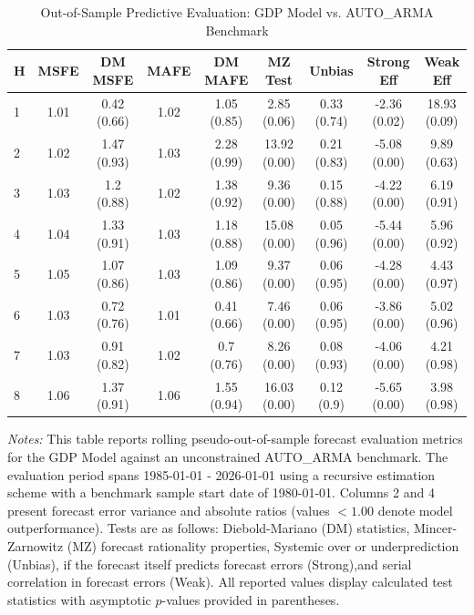 \begin{table}[htbp]
\centering
\caption{Out-of-Sample Predictive Evaluation: GDP Model vs. AUTO_ARMA Benchmark}
\label{tab:gdp_model_evaluation}
\footnotesize
\begin{tabular}{l cccccccc}
\hline\hline
\rule{0pt}{3ex}
\textbf{H} & \textbf{MSFE} & \textbf{DM MSFE} & \textbf{MAFE} & \textbf{DM MAFE} & \textbf{MZ Test} & \textbf{Unbias} & \textbf{Strong Eff} & \textbf{Weak Eff} \\[0.5ex]
\hline
\rule{0pt}{2.5ex}
1 & 1.01 & 0.42 (0.66) & 1.02 & 1.05 (0.85) & 2.85 (0.06) & 0.33 (0.74) & -2.36 (0.02) & 18.93 (0.09) \\
2 & 1.02 & 1.47 (0.93) & 1.03 & 2.28 (0.99) & 13.92 (0.00) & 0.21 (0.83) & -5.08 (0.00) & 9.89 (0.63) \\
3 & 1.03 & 1.2 (0.88) & 1.02 & 1.38 (0.92) & 9.36 (0.00) & 0.15 (0.88) & -4.22 (0.00) & 6.19 (0.91) \\
4 & 1.04 & 1.33 (0.91) & 1.03 & 1.18 (0.88) & 15.08 (0.00) & 0.05 (0.96) & -5.44 (0.00) & 5.96 (0.92) \\
5 & 1.05 & 1.07 (0.86) & 1.03 & 1.09 (0.86) & 9.37 (0.00) & 0.06 (0.95) & -4.28 (0.00) & 4.43 (0.97) \\
6 & 1.03 & 0.72 (0.76) & 1.01 & 0.41 (0.66) & 7.46 (0.00) & 0.06 (0.95) & -3.86 (0.00) & 5.02 (0.96) \\
7 & 1.03 & 0.91 (0.82) & 1.02 & 0.7 (0.76) & 8.26 (0.00) & 0.08 (0.93) & -4.06 (0.00) & 4.21 (0.98) \\
8 & 1.06 & 1.37 (0.91) & 1.06 & 1.55 (0.94) & 16.03 (0.00) & 0.12 (0.9) & -5.65 (0.00) & 3.98 (0.98) \\
\hline\hline
\end{tabular}%
\par\smallskip
\parbox{\textwidth}{\scriptsize \textit{Notes:} This table reports rolling pseudo-out-of-sample forecast evaluation metrics for the GDP Model against an unconstrained AUTO_ARMA benchmark. The evaluation period spans 1985-01-01 - 2026-01-01 using a recursive estimation scheme with a benchmark sample start date of 1980-01-01. Columns 2 and 4 present forecast error variance and absolute ratios (values $< 1.00$ denote model outperformance). Tests are as follows: Diebold-Mariano (DM) statistics, Mincer-Zarnowitz (MZ) forecast rationality properties, Systemic over or underprediction (Unbias), if the forecast itself predicts forecast errors (Strong),and serial correlation in forecast errors (Weak). All reported values display calculated test statistics with asymptotic $p$-values provided in parentheses.}
\end{table}
